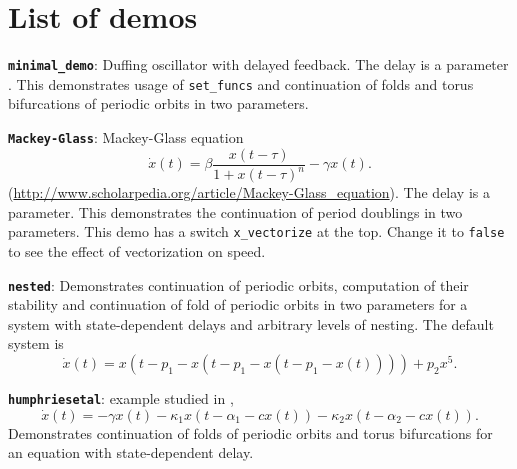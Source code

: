 \documentclass[11pt]{scrartcl}
\newcommand{\blist}[1]{\mbox{\lstinline!#1!}}
\begin{document}
\section{List of demos}\label{sec:demos}
\begin{compactitem}
\item \textbf{\texttt{minimal\_demo}}: Duffing oscillator with delayed
  feedback. The delay is a parameter \cite{YP09}. This demonstrates
  usage of \blist{set_funcs} and continuation of folds and torus
  bifurcations of periodic orbits in two parameters.
\item \textbf{\texttt{Mackey-Glass}}: Mackey-Glass equation
  \begin{displaymath}
    \dot x(t)=\beta
  \frac{x(t-\tau)}{1+x(t-\tau)^n}-\gamma x(t)\mbox{.}
\end{displaymath}
(\url{http://www.scholarpedia.org/article/Mackey-Glass_equation}). The
delay is a parameter. This demonstrates the continuation of period
doublings in two parameters. This demo has a switch
\blist{x_vectorize} at the top. Change it to \blist{false} to see the
effect of vectorization on speed.
\item \textbf{\texttt{nested}}: Demonstrates continuation of periodic
  orbits, computation of their stability and continuation of fold of
  periodic orbits in two parameters for a system with state-dependent delays and arbitrary levels of nesting. The default system is
  \begin{displaymath}
    \dot x(t)=x(t-p_1-x(t-p_1-x(t-p_1-x(t))))+p_2x^5\mbox{.}
  \end{displaymath}
\item \textbf{\texttt{humphriesetal}}: example studied in \cite{HDMU12},
  \begin{displaymath}
    \dot x(t)=-\gamma x(t)-\kappa_1x(t-\alpha_1-cx(t))-
    \kappa_2x(t-\alpha_2-cx(t))\mbox{.}
  \end{displaymath}
  Demonstrates continuation of folds of periodic orbits and torus
  bifurcations for an equation with state-dependent delay.
\end{compactitem}
\end{document}
